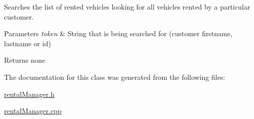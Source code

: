 Searches the list of rented vehicles looking for all vehicles rented by a particular customer.


\begin{DoxyParams}{Parameters}
{\em token} & String that is being searched for (customer firstname, lastname or id) \\
\hline
\end{DoxyParams}
\begin{DoxyReturn}{Returns}
none 
\end{DoxyReturn}


The documentation for this class was generated from the following files\+:\begin{DoxyCompactItemize}
\item 
\hyperlink{rental_manager_8h}{rental\+Manager.\+h}\item 
\hyperlink{rental_manager_8cpp}{rental\+Manager.\+cpp}\end{DoxyCompactItemize}
